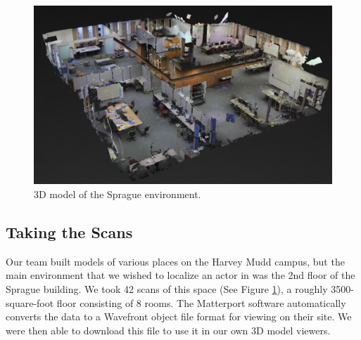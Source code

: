 \documentclass[a4paper,11pt]{article}
\begin{document}
   \begin{figure}[h!]
   \centering
     \includegraphics[width=\textwidth]{../Artifacts/rp1}
   \caption{3D model of the Sprague environment.}
   \label{fig:map}
  \end{figure}
  
  \subsection{Taking the Scans}
 Our team built models of various places on the Harvey Mudd campus, but the main environment that we wished to localize an actor in was the 2nd floor of the Sprague building. We took 42 scans of this space (See Figure \ref{fig:map}), a roughly 3500-square-foot floor consisting of 8 rooms. The Matterport software automatically converts the data to a Wavefront object  file format for viewing on their site. We were then able to download this file to use it in our own 3D model viewers. 

%  
\end{document}
